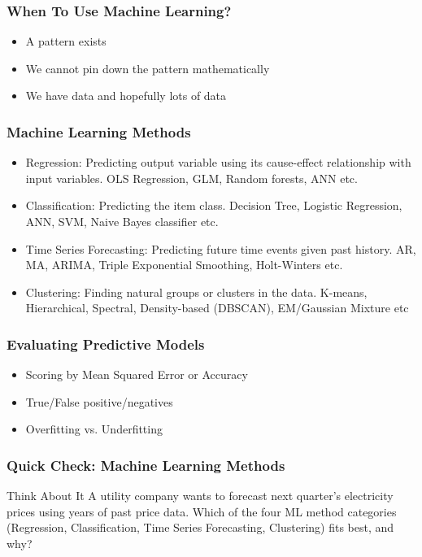 \begin{frame}\frametitle{When To Use Machine Learning?}

\begin{itemize}
\item A pattern exists
\item We cannot pin down the pattern
mathematically
\item We have data and hopefully lots of
data
\end{itemize}

\end{frame}

\begin{frame}\frametitle{Machine Learning Methods}

\begin{itemize}
\item Regression: Predicting output variable using its cause-effect relationship with
input variables. OLS Regression, GLM, Random forests, ANN etc.
\item Classification: Predicting the item class. Decision Tree, Logistic Regression, ANN,
SVM, Naive Bayes classifier etc.
\item Time Series Forecasting: Predicting future time events given past history. AR, MA, ARIMA,
Triple Exponential Smoothing, Holt-Winters etc.
\item Clustering:
Finding natural groups or clusters in the data. K-means, Hierarchical, Spectral, Density-based (DBSCAN), EM/Gaussian Mixture etc
\end{itemize}

\end{frame}


\begin{frame}\frametitle{Evaluating Predictive Models}

\begin{itemize}
\item Scoring by Mean Squared Error or Accuracy
\item True/False positive/negatives
\item Overfitting vs. Underfitting
\end{itemize}

\end{frame}

\begin{frame}[fragile]\frametitle{Quick Check: Machine Learning Methods}
\begin{block}{Think About It}
A utility company wants to forecast next quarter's electricity prices using years of past
price data. Which of the four ML method categories (Regression, Classification, Time
Series Forecasting, Clustering) fits best, and why?
\end{block}
\end{frame}


